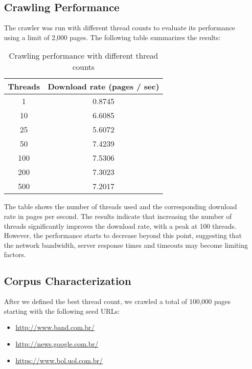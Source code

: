 \documentclass[sigconf]{acmart}
\begin{document}
\subsection{Crawling Performance}
The crawler was run with different thread counts to evaluate its performance using a limit of 2,000 pages. The following table summarizes the results:
\begin{table}[H]
\centering
\begin{tabular}{|c|c|}
\hline
\textbf{Threads} & \textbf{Download rate (pages / sec)} \\ \hline
1 & 0.8745 \\ \hline
10 & 6.6085 \\ \hline
25 & 5.6072 \\ \hline
50 & 7.4239 \\ \hline
100 & 7.5306 \\ \hline
200 & 7.3023 \\ \hline
500 & 7.2017 \\ \hline
\end{tabular}
\caption{Crawling performance with different thread counts}
\label{tab:performance}
\end{table}
The table shows the number of threads used and the corresponding download rate in pages per second. The results indicate that increasing the number of threads significantly improves the download rate, with a peak at 100 threads.
However, the performance starts to decrease beyond this point, suggesting that the network bandwidth, server response times and timeouts may become limiting factors.

\subsection{Corpus Characterization}
After we defined the best thread count, we crawled a total of 100,000 pages starting with the following seed URLs:
\begin{itemize}
  \item \url{http://www.band.com.br/}
  \item \url{http://news.google.com.br/}
  \item \url{https://www.bol.uol.com.br/}
\end{itemize}
\end{document}
